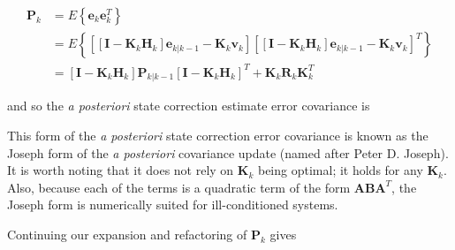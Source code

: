 \begin{equation*}
    \begin{aligned}
        \mathbf{P}_{k} &= E \left\{ \mathbf{e}_{k} \mathbf{e}_{k}^T \right\} \\
        &= E \left\{ \left[ \left[ \mathbf{I} - \mathbf{K}_k \mathbf{H}_k \right] \mathbf{e}_{k|k-1} - \mathbf{K}_k \mathbf{v}_k \right]
                \left[ \left[ \mathbf{I} - \mathbf{K}_k \mathbf{H}_k \right] \mathbf{e}_{k|k-1} - \mathbf{K}_k \mathbf{v}_k \right]^T \right\} \\
        &= \left[ \mathbf{I} - \mathbf{K}_k \mathbf{H}_k \right] \mathbf{P}_{k|k-1} \left[ \mathbf{I} - \mathbf{K}_k \mathbf{H}_k \right]^T
                 + \mathbf{K}_k \mathbf{R}_k \mathbf{K}_k^T
    \end{aligned}
\end{equation*}

and so the \textit{a posteriori} state correction estimate error covariance is


This form of the \textit{a posteriori} state correction error covariance is known as the
Joseph form of the \textit{a posteriori} covariance update (named after Peter D. Joseph).
It is worth noting that it does not rely on $\mathbf{K}_{k}$ being optimal; it holds for
any $\mathbf{K}_{k}$. Also, because each of the terms is a quadratic term of the form 
$\mathbf{A} \mathbf{B} \mathbf{A}^T$, the Joseph form is numerically suited for
ill-conditioned systems.

Continuing our expansion and refactoring of $\mathbf{P}_{k}$ gives

